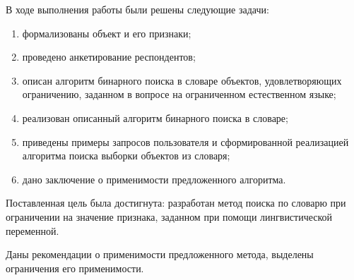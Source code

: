 \vspace{\baselineskip}

В ходе выполнения работы были решены следующие задачи:

\begin{enumerate}[label=---]
        \item формализованы объект и его признаки;
        \item проведено анкетирование респондентов; 
        \item описан алгоритм бинарного поиска в словаре объектов, удовлетворяющих ограничению, заданном в вопросе на ограниченном естественном языке;
	\item реализован описанный алгоритм бинарного поиска в словаре;
        \item приведены примеры запросов пользователя и сформированной реализацией алгоритма поиска выборки объектов из словаря;
        \item дано заключение о применимости предложенного алгоритма.
\end{enumerate}

Поставленная цель была достигнута: разработан метод поиска по словарю при ограничении на значение признака, заданном при помощи лингвистической переменной.

Даны рекомендации о применимости предложенного метода, выделены ограничения его применимости.